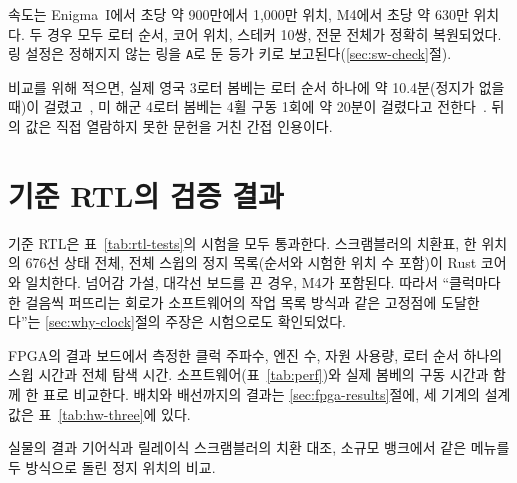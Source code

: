 속도는 Enigma~I에서 초당 약 900만에서 1,000만 위치, M4에서 초당 약 630만 위치다. 두 경우 모두 로터 순서,
코어 위치, 스테커 10쌍, 전문 전체가 정확히 복원되었다. 링 설정은 정해지지 않는 링을 \texttt{A}로 둔 등가
키로 보고된다(\ref{sec:sw-check}절).

비교를 위해 적으면, 실제 영국 3로터 봄베는 로터 순서 하나에 약 10.4분(정지가 없을 때)이
걸렸고~\cite{jackson-bh09,jackson-bh11}, 미 해군 4로터 봄베는 4휠 구동 1회에 약 20분이 걸렸다고
전한다~\cite{ekhall-hallenberg2018}. 뒤의 값은 직접 열람하지 못한 문헌을 거친 간접 인용이다.

\section{기준 RTL의 검증 결과}

기준 RTL은 표~\ref{tab:rtl-tests}의 시험을 모두 통과한다. 스크램블러의 치환표, 한 위치의 676선 상태 전체,
전체 스윕의 정지 목록(순서와 시험한 위치 수 포함)이 Rust 코어와 일치한다. 넘어감 가설, 대각선 보드를 끈
경우, M4가 포함된다. 따라서 ``클럭마다 한 걸음씩 퍼뜨리는 회로가 소프트웨어의 작업 목록 방식과 같은
고정점에 도달한다''는 \ref{sec:why-clock}절의 주장은 시험으로도 확인되었다.

\begin{todobox}{FPGA의 결과}
보드에서 측정한 클럭 주파수, 엔진 수, 자원 사용량, 로터 순서 하나의 스윕 시간과 전체 탐색 시간.
소프트웨어(표~\ref{tab:perf})와 실제 봄베의 구동 시간과 함께 한 표로 비교한다. 배치와 배선까지의 결과는
\ref{sec:fpga-results}절에, 세 기계의 설계값은 표~\ref{tab:hw-three}에 있다.
\end{todobox}

\begin{todobox}{실물의 결과}
기어식과 릴레이식 스크램블러의 치환 대조, 소규모 뱅크에서 같은 메뉴를 두 방식으로 돌린 정지 위치의 비교.
\end{todobox}
